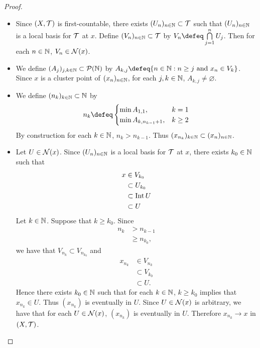\documentclass{book}
\begin{document}
	\begin{proof}\
		\begin{itemize}
			\item Since $(X, \mathcal{T})$ is first-countable, there exists $(U_n)_{n \in \mathbb{N}} \subset \mathcal{T}$ such that $(U_n)_{n \in \mathbb{N}}$ is a local basis for $\mathcal{T}$ at $x$. Define $(V_n)_{n \in \mathbb{N}} \subset \mathcal{T}$ by $V_n \defeq \bigcap\limits_{j=1}^n U_j$. Then for each $n \in \mathbb{N}$, $V_n \in \mathcal{N}(x)$. 
			\item We define $(A_j)_{j,k \in \mathbb{N}} \subset \mathcal{P}(\mathbb{N})$ by $A_{k,j} \defeq \{n \in \N: n \geq j  \text{ and } x_n \in V_k\}$. Since $x$ is a cluster point of $(x_n)_{n \in \mathbb{N}}$, for each $j,k \in \mathbb{N}$, $A_{k,j} \neq \varnothing$.  
			\item We define $(n_k)_{k \in \mathbb{N}} \subset \mathbb{N}$ by 
			\[
			n_k \defeq 
			\begin{cases}
				\min A_{1, 1}, & k = 1 \\
				\min A_{k, n_{k-1} + 1}, & k \geq 2
			\end{cases} 
			\]
			By construction for each $k \in \mathbb{N}$, $n_k > n_{k-1}$. Thus $(x_{n_k})_{k \in \mathbb{N}} \subset (x_n)_{n \in \mathbb{N}}$. 
			\item Let $U \in \mathcal{N}(x)$. Since $(U_n)_{n \in \mathbb{N}}$ is a local basis for $\mathcal{T}$ at $x$, there exists $k_0 \in \mathbb{N}$ such that 
			\begin{align*}
				x 
				& \in V_{k_0} \\
				& \subset U_{k_0} \\
				& \subset \operatorname{Int} U \\
				& \subset U
			\end{align*}
			Let $k \in \mathbb{N}$. Suppose that $k \geq k_0$. Since 
			\begin{align*}
				n_k 
				& > n_{k-1} \\
				& \geq n_{k_0},
			\end{align*}
			we have that $V_{n_k} \subset V_{n_{k_0}}$ and
			\begin{align*}
				x_{n_k}
				& \in V_{n_k} \\
				& \subset V_{k_0} \\
				& \subset U.
			\end{align*}
			Hence there exists $k_0 \in \mathbb{N}$ such that for each $k \in \mathbb{N}$, $k \geq k_0$ implies that $x_{n_k} \in U$. Thus $(x_{n_k})$ is eventually in $U$. Since $U \in \mathcal{N}(x)$ is arbitrary, we have that for each $U \in \mathcal{N}(x)$, $(x_{n_k})$ is eventually in $U$. Therefore $x_{n_k} \rightarrow x$ in $(X, \mathcal{T})$. 
		\end{itemize}
	\end{proof}
\end{document}
